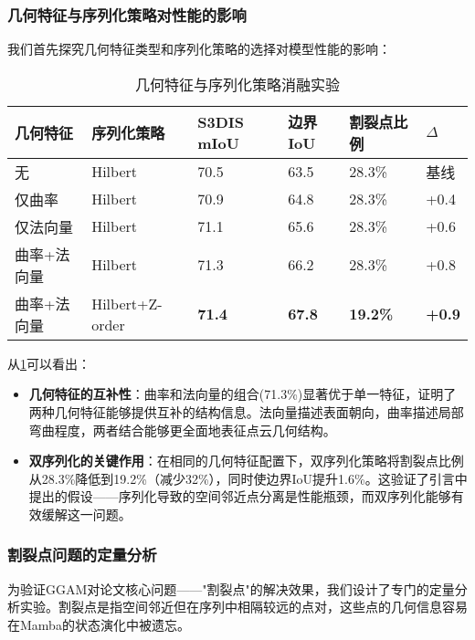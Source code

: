 \documentclass[preprint,12pt]{elsarticle}
\begin{document}
\subsubsection{几何特征与序列化策略对性能的影响}
我们首先探究几何特征类型和序列化策略的选择对模型性能的影响：

\begin{table}[htbp!]
	\centering
	\caption{几何特征与序列化策略消融实验}
	\label{tab:ggam_feature_serialization}
	\begin{tabular}{@{}llllll@{}}
		\toprule
		几何特征 & 序列化策略 & S3DIS mIoU & 边界IoU & 割裂点比例 & $\Delta$ \\ 
		\midrule
		无 & Hilbert & 70.5 & 63.5 & 28.3\% & 基线 \\
		\midrule
		仅曲率 & Hilbert & 70.9 & 64.8 & 28.3\% & +0.4 \\
		仅法向量 & Hilbert & 71.1 & 65.6 & 28.3\% & +0.6 \\
		曲率+法向量 & Hilbert & 71.3 & 66.2 & 28.3\% & +0.8 \\
		\midrule
		曲率+法向量 & Hilbert+Z-order & \textbf{71.4} & \textbf{67.8} & \textbf{19.2\%} & \textbf{+0.9} \\
		\bottomrule
	\end{tabular}
\end{table}

从\cref{tab:ggam_feature_serialization}可以看出：
\begin{itemize}
	\item \textbf{几何特征的互补性}：曲率和法向量的组合(71.3\%)显著优于单一特征，证明了两种几何特征能够提供互补的结构信息。法向量描述表面朝向，曲率描述局部弯曲程度，两者结合能够更全面地表征点云几何结构。
	
	\item \textbf{双序列化的关键作用}：在相同的几何特征配置下，双序列化策略将割裂点比例从28.3\%降低到19.2\%（减少32\%），同时使边界IoU提升1.6\%。这验证了引言中提出的假设——序列化导致的空间邻近点分离是性能瓶颈，而双序列化能够有效缓解这一问题。
\end{itemize}

\subsubsection{割裂点问题的定量分析}
为验证GGAM对论文核心问题——"割裂点"的解决效果，我们设计了专门的定量分析实验。割裂点是指空间邻近但在序列中相隔较远的点对，这些点的几何信息容易在Mamba的状态演化中被遗忘。
\end{document}
